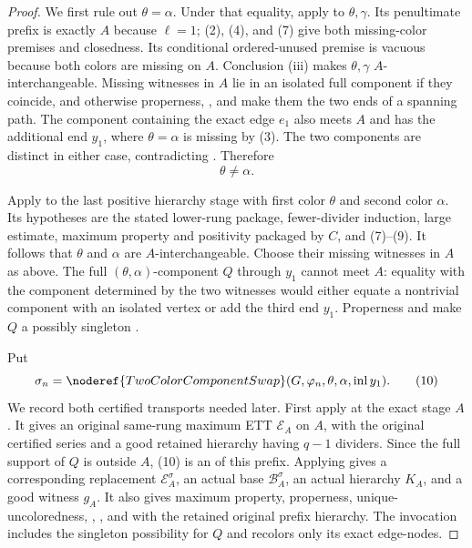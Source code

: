 \begin{proof}
We first rule out $\theta=\alpha$.  Under that equality, apply
 to $\theta,\gamma$.  Its penultimate prefix is
exactly $A$ because $\ell=1$; (2), (4), and (7) give both missing-color
premises and closedness.  Its conditional ordered-unused premise is
vacuous because both colors are missing on $A$.  Conclusion (iii) makes
$\theta,\gamma$ $A$-interchangeable.  Missing witnesses in $A$ lie in
an isolated full component if they coincide, and otherwise properness,
, and
 make them the two ends of a
spanning path.  The component containing the exact edge $e_1$ also
meets $A$ and has the additional end $y_1$, where $\theta=\alpha$ is
missing by (3).  The two components are distinct in either case,
contradicting .  Therefore
\[
                         \theta\ne\alpha.                    \tag{9}
\]

Apply  to the last positive hierarchy stage with first
color $\theta$ and second color $\alpha$.  Its hypotheses are the stated
lower-rung package, fewer-divider induction, large estimate, maximum
property and positivity packaged by $C$, and (7)--(9).  It follows that
$\theta$ and $\alpha$ are $A$-interchangeable.  Choose their missing
witnesses in $A$ as above.  The full
$(\theta,\alpha)$-component $Q$ through $y_1$ cannot meet $A$: equality
with the component determined by the two witnesses would either equate
a nontrivial component with an isolated vertex or add the third end
$y_1$.  Properness and
 make $Q$ a possibly singleton
.

Put
\[
 \sigma_n=\noderef{TwoColorComponentSwap}
       (G,\varphi_n,\theta,\alpha,\operatorname{inl}y_1).     \tag{10}
\]
We record both certified transports needed later.  First apply
 at the exact stage $A$.  It gives
an original same-rung maximum ETT $\mathcal E_A$ on $A$, with the
original certified series and a good retained hierarchy having $q-1$
dividers.  Since the full support of $Q$ is outside $A$, (10) is an
 of this prefix.  Applying
 gives a corresponding replacement
$\mathcal E_A^\sigma$, an actual base $\mathcal B_A^\sigma$, an actual
hierarchy $K_A$, and a good witness $g_A$.  It also gives maximum
property, properness, unique-uncoloredness,
, , and
 with the retained original prefix
hierarchy.  The invocation includes the singleton possibility for $Q$
and recolors only its exact edge-nodes.


\end{proof}
